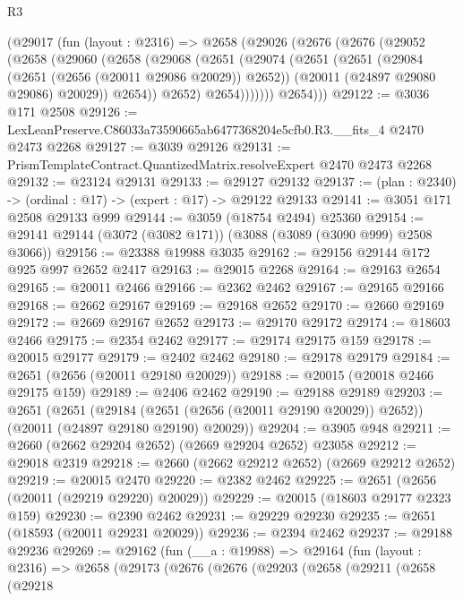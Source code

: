 \begin{lexlean}{R3}
\begin{coremodule}
    (@29017
      (fun (layout : @2316) =>
      @2658
        (@29026
          (@2676
            (@2676
              (@29052
                (@2658
                  (@29060
                    (@2658
                      (@29068
                        (@2651
                          (@29074
                            (@2651
                              (@2651
                                (@29084 (@2651 (@2656 (@20011 @29086 @20029)) @2652))
                                (@20011 (@24897 @29080 @29086) @20029))
                              @2654))
                          @2652)
                        @2654)))))))
          @2654)))
@29122 := @3036 @171 @2508
@29126 := LexLeanPreserve.C86033a73590665ab6477368204e5cfb0.R3.__fits_4 @2470 @2473 @2268
@29127 := @3039 @29126
@29131 := PrismTemplateContract.QuantizedMatrix.resolveExpert @2470 @2473 @2268
@29132 := @23124 @29131
@29133 := @29127 @29132
@29137 := (plan : @2340) -> (ordinal : @17) -> (expert : @17) -> @29122 @29133
@29141 := @3051 @171 @2508 @29133 @999
@29144 := @3059 (@18754 @2494) @25360
@29154 := @29141 @29144 (@3072 (@3082 @171)) (@3088 (@3089 (@3090 @999) @2508 @3066))
@29156 := @23388 @19988 @3035
@29162 := @29156 @29144 @172 @925 @997 @2652 @2417
@29163 := @29015 @2268
@29164 := @29163 @2654
@29165 := @20011 @2466
@29166 := @2362 @2462
@29167 := @29165 @29166
@29168 := @2662 @29167
@29169 := @29168 @2652
@29170 := @2660 @29169
@29172 := @2669 @29167 @2652
@29173 := @29170 @29172
@29174 := @18603 @2466
@29175 := @2354 @2462
@29177 := @29174 @29175 @159
@29178 := @20015 @29177
@29179 := @2402 @2462
@29180 := @29178 @29179
@29184 := @2651 (@2656 (@20011 @29180 @20029))
@29188 := @20015 (@20018 @2466 @29175 @159)
@29189 := @2406 @2462
@29190 := @29188 @29189
@29203 := @2651
    (@2651
      (@29184 (@2651 (@2656 (@20011 @29190 @20029)) @2652))
      (@20011 (@24897 @29180 @29190) @20029))
@29204 := @3905 @948
@29211 := @2660 (@2662 @29204 @2652) (@2669 @29204 @2652) @23058
@29212 := @29018 @2319
@29218 := @2660 (@2662 @29212 @2652) (@2669 @29212 @2652)
@29219 := @20015 @2470
@29220 := @2382 @2462
@29225 := @2651 (@2656 (@20011 (@29219 @29220) @20029))
@29229 := @20015 (@18603 @29177 @2323 @159)
@29230 := @2390 @2462
@29231 := @29229 @29230
@29235 := @2651 (@18593 (@20011 @29231 @20029))
@29236 := @2394 @2462
@29237 := @29188 @29236
@29269 := @29162
    (fun (__a : @19988) =>
    @29164
      (fun (layout : @2316) =>
      @2658
        (@29173
          (@2676
            (@2676
              (@29203
                (@2658
                  (@29211
                    (@2658
                      (@29218

\end{coremodule}
\end{lexlean}
